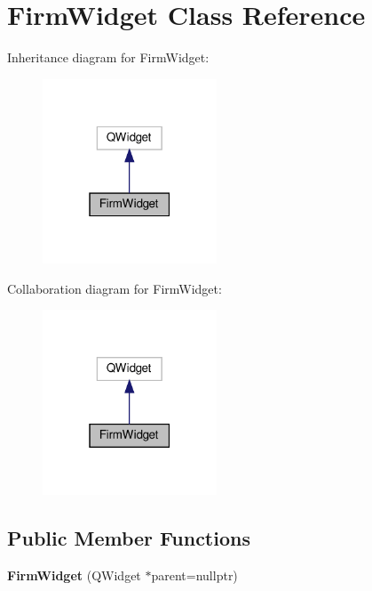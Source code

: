 \hypertarget{classFirmWidget}{}\section{Firm\+Widget Class Reference}
\label{classFirmWidget}


Inheritance diagram for Firm\+Widget\+:
\nopagebreak
\begin{figure}[H]
\begin{center}
\leavevmode
\includegraphics[width=147pt]{classFirmWidget__inherit__graph}
\end{center}
\end{figure}


Collaboration diagram for Firm\+Widget\+:
\nopagebreak
\begin{figure}[H]
\begin{center}
\leavevmode
\includegraphics[width=147pt]{classFirmWidget__coll__graph}
\end{center}
\end{figure}
\subsection*{Public Member Functions}
\begin{DoxyCompactItemize}
\item 
\mbox{\label{classFirmWidget_a67b0b5242477f5523a6e00874f4d8af5}} 
{\bfseries Firm\+Widget} (Q\+Widget $\ast$parent=nullptr)
\end{DoxyCompactItemize}


